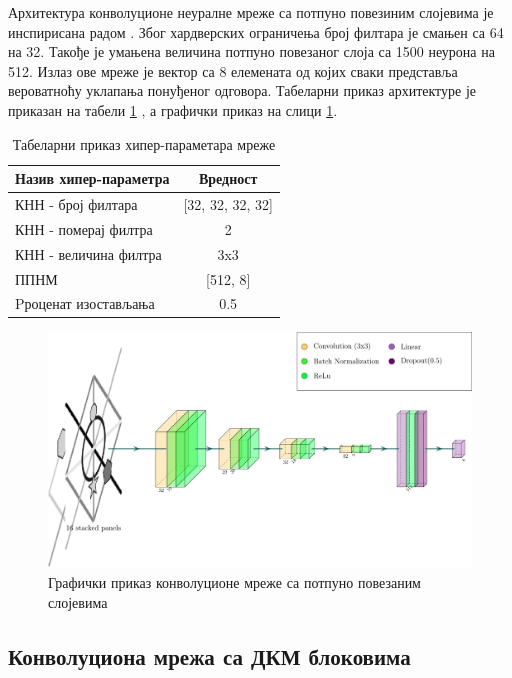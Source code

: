 \documentclass[a4paper, 12pt, master, utf8]{etf}
\begin{document}
Архитектура конволуционе неуралне мреже са потпуно повезиним слојевима је инспирисана радом \cite{barrett_measuring_2018}.
Због хардверских ограничења број филтара је смањен са 64 на 32. Такође је умањена величина потпуно повезаног слоја са 1500 неурона на 512.
Излаз ове мреже је вектор са 8 елемената од којих сваки представља вероватноћу уклапања понуђеног одговора. Табеларни приказ архитектуре је 
приказан на табели \ref{tab:cnnmlp} , а графички приказ на слици \ref{fig:cnnmlp}.

\begin{table}[h]
    \centering
    \begin{tabular}{l | c}
    \hline
    Назив хипер-параметра & Вредност\\
    \hline
        КНН - број филтара & [32, 32, 32, 32]\\
        КНН - померај филтра & 2\\
        КНН - величина филтра & 3x3\\
        ППНМ & [512, 8]\\
        Pроценат изостављања & 0.5
    \end{tabular}
    \caption{Табеларни приказ хипер-параметара мреже}
    \label{tab:cnnmlp}
\end{table}

\begin{figure}[h]
    \centering
    \includegraphics[width=\textwidth]{arhitekture/cnn.pdf}
    \caption{Графички приказ конволуционе мреже са потпуно повезаним слојевима}
    \label{fig:cnnmlp}
\end{figure}

\subsection{Конволуциона мрежа са ДКМ блоковима}
\end{document}
